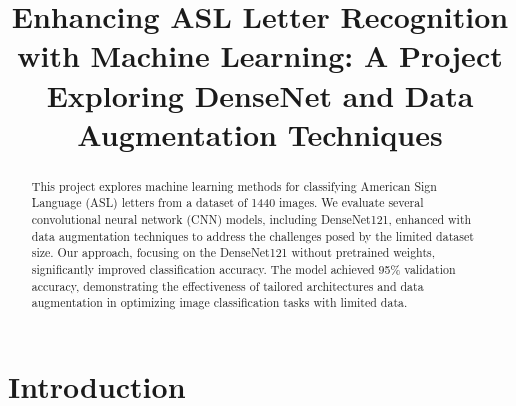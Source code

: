 \documentclass[conference]{IEEEtran}
\begin{document}
\title{Enhancing ASL Letter Recognition with Machine Learning: A Project Exploring DenseNet and Data Augmentation Techniques\\}

\author{
}

\maketitle

\begin{abstract}
This project explores machine learning methods for classifying American Sign Language (ASL) letters from a dataset of 1440 images. We evaluate several convolutional neural network (CNN) models, including DenseNet121, enhanced with data augmentation techniques to address the challenges posed by the limited dataset size. Our approach, focusing on the DenseNet121 without pretrained weights, significantly improved classification accuracy. The model achieved 95\% validation accuracy, demonstrating the effectiveness of tailored architectures and data augmentation in optimizing image classification tasks with limited data.
\end{abstract}

\section{Introduction}
\end{document}
